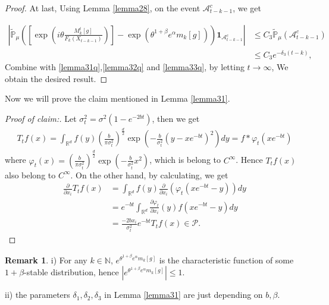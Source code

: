 \documentclass[12pt, a4paper]{amsart}
\theoremstyle{definition}
\newtheorem{rem}[thm]{Remark}
\numberwithin{equation}{section}
\begin{document}
\begin{proof}
At last, Using Lemma \ref{lemma28}, on the event $\mathcal{A}^c_{t-k-1}$, we get

\begin{align}
    \left|\mathbb{\tilde{P}}_{\mu}\left([\exp(i\theta \frac {M_k^t[g]}{F_k(X_{t-k-1})})]-\exp(\theta^{1+\beta}e^{\alpha}m_k[g])\right)\mathbf{1}_{\mathcal{A}^c_{t-k-1}}\right|&\leq C_3\mathbb{\tilde{P}}_{\mu}(\mathcal{A}^c_{t-k-1})\nonumber\\
    &\leq C_3 e^{-\delta_3(t-k)},\label{lemma33q}
\end{align}
Combine with \eqref{lemma31q},\eqref{lemma32q} and \eqref{lemma33q}, by letting $t \rightarrow \infty$, We obtain the desired result. 
\end{proof}

Now we will prove the claim mentioned in Lemma \ref{lemma31}.


\begin{proof}[Proof of claim:] Let $\sigma_t^2=\sigma^2(1-e^{-2bt})$, then we get
\begin{align*}
    T_t f(x)= \int_{\mathbb{R}^d}f(y)\left(\frac{b}{\pi \sigma_t^2}\right)^{\frac{d}{2}} \exp\left(-\frac{b}{\sigma_t^2}(y-xe^{-bt})^2\right)dy=f\ast\varphi_t(xe^{-bt})
\end{align*}
where $\varphi_t(x)=\left(\frac{b}{\pi \sigma_t^2}\right)^{\frac{d}{2}} \exp\left(-\frac{b}{\sigma_t^2}x^2\right)$, which is belong to $C^{\infty}$. Hence $  T_t f(x)$ also belong to $C^{\infty}$. On the other hand, by calculating, we get
\begin{align*}
    \frac{\partial}{\partial x_i}T_t f(x)&=\int_{\mathbb{R}^d}f(y)\frac{\partial}{\partial x_i}\left(\varphi_t(xe^{-bt}-y)\right)dy\\
    &=e^{-bt}\int_{\mathbb{R}^d}\frac{\partial \varphi_t}{\partial x_i}(y)f(xe^{-bt}-y)dy\\
    &=\frac{-2bx_i}{\sigma_t^2}e^{-bt}T_t f(x)\in \mathcal{P}.
\end{align*}
\end{proof}
\begin{rem}
   i) For any $k\in\mathbb{N}$, $e^{\theta^{1+\beta}e^{\alpha}m_k[g]}$ is the characteristic function of some $1+\beta$-stable distribution, hence $|e^{\theta^{1+\beta}e^{\alpha}m_k[g]}|\leq 1$.
   
   ii) the parameters $\delta_1,\delta_2, \delta_3$ in Lemma \ref{lemma31} are just depending on $b,\beta$.
\end{rem}
\end{document}
